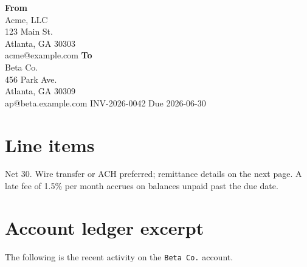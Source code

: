 \documentclass[11pt]{article}
\begin{document}
\makedoctitle
\makedocsummary

\invoiceheader
  {\textbf{From}\\Acme, LLC\\123 Main St.\\Atlanta, GA 30303\\acme@example.com}
  {\textbf{To}\\Beta Co.\\456 Park Ave.\\Atlanta, GA 30309\\ap@beta.example.com}
  {INV-2026-0042}
  {Due 2026-06-30}

\section*{Line items}
\begin{lineitems}
\end{lineitems}


\vspace{1em}
\begin{notebox}
Net 30. Wire transfer or ACH preferred; remittance details on the next
page. A late fee of 1.5\% per month accrues on balances unpaid past the
due date.
\end{notebox}

\section*{Account ledger excerpt}
The following is the recent activity on the \texttt{Beta Co.} account.

\begin{ledger}
\end{ledger}
\end{document}

